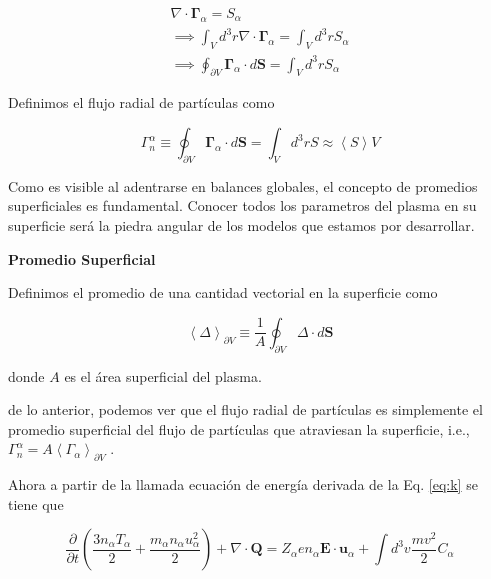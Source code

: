\documentclass[11pt]{article}
\theoremstyle{definition}
\begin{document}
  \begin{eqnarray*}
    \nabla\cdot\pmb{\Gamma}_\alpha = S_\alpha \\
    \implies \int_V d^3r\nabla\cdot\pmb{\Gamma}_\alpha = \int_V d^3r S_\alpha\\
    \implies \oint_{\partial V} \pmb{\Gamma}_\alpha\cdot d\textbf{S} = \int_V d^3r S_\alpha
  \end{eqnarray*}

  Definimos el flujo radial de part\'iculas como

  \begin{equation}\label{eq:rtpf}
    \Gamma_n^\alpha \equiv \oint_{\partial V} \pmb{\Gamma}_\alpha \cdot d\textbf{S} = \int_V d^3r S \approx \left<S\right>V
  \end{equation}

  Como es visible al adentrarse en balances globales, el concepto de promedios superficiales es fundamental. Conocer todos los parametros del plasma en su superficie ser\'a la piedra angular de los modelos que estamos por desarrollar.

  \begin{shaded}
    \textbf{Promedio Superficial}

    Definimos el promedio de una cantidad vectorial en la superficie como 

    \begin{equation}
      \left<\pmb{\varDelta}\right>_{\partial V} \equiv \frac{1}{A}\oint_{\partial V}\pmb{\varDelta}\cdot d\textbf{S}
    \end{equation}

    donde $A$ es el \'area superficial del plasma.
  \end{shaded}

  de lo anterior, podemos ver que el flujo radial de part\'iculas es simplemente el promedio superficial del flujo de part\'iculas que atraviesan la superficie, i.e., $\Gamma_n^\alpha = A\left<\Gamma_\alpha\right>_{\partial V}$ \cite{dinklage2005}.
  
  Ahora a partir de la llamada ecuaci\'on de energ\'ia \cite{helander2005} derivada de la Eq. \eqref{eq:k} se tiene que

  \begin{equation}\label{eq:energy}
    \frac{\partial}{\partial t}\left(\frac{3n_\alpha T_\alpha}{2} + \frac{m_\alpha n_\alpha u_\alpha^2}{2}\right) + \nabla\cdot\textbf{Q} = Z_\alpha e n_\alpha \textbf{E}\cdot\textbf{u}_\alpha + \int d^3v\frac{mv^2}{2}C_\alpha
  \end{equation} 
\end{document}
